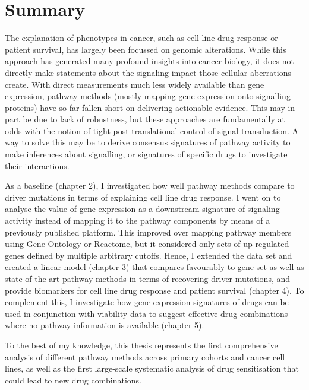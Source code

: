 \chapter*{Summary}
The explanation of phenotypes in cancer, such as cell line drug response or
patient survival, has largely been focussed on genomic alterations. While this
approach has generated many profound insights into cancer biology, it does not
directly make statements about the signaling impact those cellular aberrations
create. With direct measurements much less widely available than gene
expression, pathway methods (mostly mapping gene expression onto signalling
proteins) have so far fallen short on delivering actionable evidence. This may
in part be due to lack of robustness, but these approaches are fundamentally at
odds with the notion of tight post-translational control of signal
transduction. A way to solve this may be to derive consensus signatures of
pathway activity to make inferences about signalling, or signatures of specific
drugs to investigate their interactions.

As a baseline (chapter 2), I investigated how well pathway methods compare to
driver mutations in terms of explaining cell line drug response. I went on to
analyse the value of gene expression as a downstream signature of signaling
activity instead of mapping it to the pathway components by means of a
previously published platform. This improved over mapping pathway members using
Gene Ontology or Reactome, but it considered only sets of up-regulated genes
defined by multiple arbitrary cutoffs.  Hence, I extended the data set and
created a linear model (chapter 3) that compares favourably to gene set as well
as state of the art pathway methods in terms of recovering driver mutations,
and provide biomarkers for cell line drug response and patient survival
(chapter 4). To complement this, I investigate how gene expression signatures
of drugs can be used in conjunction with viability data to suggest effective
drug combinations where no pathway information is available (chapter 5).

To the best of my knowledge, this thesis represents the first comprehensive
analysis of different pathway methods across primary cohorts and cancer cell
lines, as well as the first large-scale systematic analysis of drug
sensitisation that could lead to new drug combinations.
